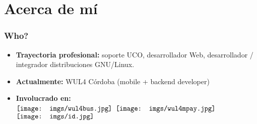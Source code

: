 \section{Acerca de mí}
\frame
{
\frametitle{Who?}
\begin{itemize}
\item \textbf{Trayectoria profesional:} soporte UCO, desarrollador Web, desarrollador / integrador distribuciones GNU/Linux.
\item \textbf{Actualmente:} WUL4 Córdoba (mobile + backend developer)
\item \textbf{Involucrado en:} \\ \vspace{10pt}
  $\vcenter{\hbox{\texttt{[image: imgs/wul4bus.jpg]}}}$
  $\vcenter{\hbox{\texttt{[image: imgs/wul4mpay.jpg]}}}$
  $\vcenter{\hbox{\texttt{[image: imgs/id.jpg]}}}$
\end{itemize}
}
